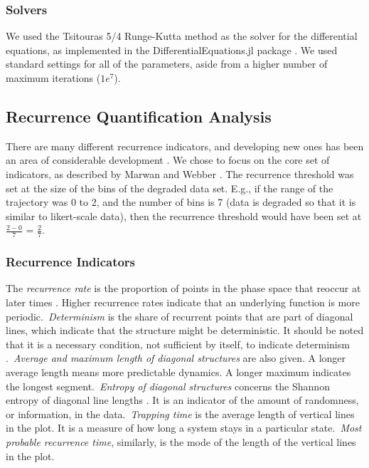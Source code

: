 \documentclass[utf8]{FrontiersinVancouver}
\begin{document}
\subsubsection{Solvers}
We used the Tsitouras 5/4 Runge-Kutta method as the solver for the differential equations, as implemented in the DifferentialEquations.jl package \citep{tsitourasRungeKuttaPairs2011}. We used standard settings for all of the parameters, aside from a higher number of maximum iterations ($1e^{7}$).  

\subsection{Recurrence Quantification Analysis}

There are many different recurrence indicators, and developing new ones has been an area of considerable development \citep{marwanTrendsRecurrenceAnalysis2023}. We chose to focus on the core set of indicators, as described by Marwan and Webber \citep{marwanMathematicalComputationalFoundations2015}. The recurrence threshold was set at the size of the bins of the degraded data set. E.g., if the range of the trajectory was 0 to 2, and the number of bins is 7 (data is degraded so that it is similar to likert-scale data), then the recurrence threshold would have been set at $\frac{2-0}{7}$ = $\frac{2}{7}$. 

\subsubsection{Recurrence Indicators}

The \textit{recurrence rate} is the proportion of points in the phase space that reoccur at later times \citep{webber2005recurrence}. Higher recurrence rates indicate that an underlying function is more periodic.\ \textit{Determinism} is the share of recurrent points that are part of diagonal lines, which indicate that the structure might be deterministic. It should be noted that it is a necessary condition, not sufficient by itself, to indicate determinism \citep{marwanHowAvoidPotential2011}.\ \textit{Average and maximum length of diagonal structures} are also given. A longer average length means more predictable dynamics. A longer maximum indicates the longest segment.\  \textit{Entropy of diagonal structures} concerns the Shannon entropy of diagonal line lengths \citep{kraemerRecurrenceThresholdSelection2018}. It is an indicator of the amount of randomness, or information, in the data.\ \textit{Trapping time} is the average length of vertical lines in the plot. It is a measure of how long a system stays in a particular state.\ \textit{Most probable recurrence time}, similarly, is the mode of the length of the vertical lines in the plot. 
\end{document}
